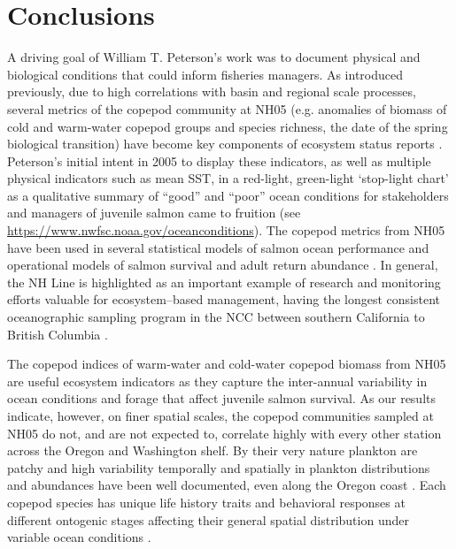 \documentclass[preprint, authoryear, 12pt]{elsarticle}
\begin{document}
\section{Conclusions}

A driving goal of William T. Peterson’s work was to document physical and biological conditions that could inform fisheries managers.  As introduced previously, due to high correlations with basin and regional scale processes, several metrics of the copepod community at NH05 (e.g. anomalies of biomass of cold and warm-water copepod groups and species richness, the date of the spring biological transition) have become key components of ecosystem status reports \citep{wells2017state, harvey2018ecosystem, harvey2019ecosystem, thompson2018state, thompson2019state}. Peterson’s initial intent in 2005 to display these indicators, as well as multiple physical indicators such as mean SST, in a red-light, green-light ‘stop-light chart’ as a qualitative summary of “good” and “poor” ocean conditions for stakeholders and managers of juvenile salmon came to fruition (see \href{https://www.nwfsc.noaa.gov/oceanconditions}{https://www.nwfsc.noaa.gov/oceanconditions}). The copepod metrics from NH05 have been used in several statistical models of salmon ocean performance \citep{burke2013multivariate, peterson2014applied, tucker2015coastal} and operational models of salmon survival and adult return abundance \citep{rupp2012marine, zimmerman20122010}. In general, the NH Line is highlighted as an important example of research and monitoring efforts valuable for ecosystem–based management, having the longest consistent oceanographic sampling program in the NCC between southern California to British Columbia \citep{harvey2020importance}.

The copepod indices of warm-water and cold-water copepod biomass from NH05 are useful ecosystem indicators as they capture the inter-annual variability in ocean conditions and forage that affect juvenile salmon survival. As our results indicate, however, on finer spatial scales, the copepod communities sampled at NH05 do not, and are not expected to, correlate highly with every other station across the Oregon and Washington shelf.  By their very nature plankton are patchy and high variability temporally and spatially in plankton distributions and abundances have been well documented, even along the Oregon coast \citep{peterson1979zonation, peterson2002effect, keister2003zonal, morgan2003onshore}. Each copepod species has unique life history traits and behavioral responses at different ontogenic stages affecting their general spatial distribution under variable ocean conditions \citep{peterson1979zonation}.
\end{document}
